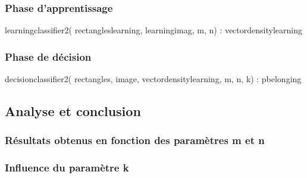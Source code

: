 \subsubsection{Phase d'apprentissage}

learningclassifier2( rectangleslearning, learningimag, m, n) : vectordensitylearning


\subsubsection{Phase de décision}

decisionclassifier2( rectangles, image, vectordensitylearning, m, n, k) : pbelonging


\subsection{Analyse et conclusion}

\subsubsection{Résultats obtenus en fonction des paramètres m et n}

\subsubsection{Influence du paramètre k}